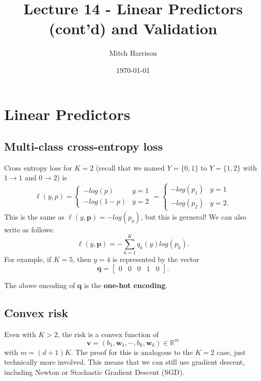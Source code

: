 \documentclass[titlepage, 12pt, leqno]{article}
\title{\Huge{Lecture 14 - Linear Predictors (cont'd) and Validation}}
\author{\large{Mitch Harrison}}
\date{\today}
\begin{document}
\setlength{\parskip}{1\baselineskip}
\setlength{\parindent}{15pt}
\maketitle
\tableofcontents
\newpage


\section{Linear Predictors}

\subsection{Multi-class cross-entropy loss}
Cross entropy loss for $K=2$ (recall that we named $Y=\{0,1\}$ to $Y=\{1,2\}$ with
$1 \rightarrow 1$ and $0 \rightarrow 2$) is 
\[
\ell(y,p) = 
\begin{cases}
    -log(p) & y = 1 \\
    -log(1-p) & y=2
\end{cases}
=
\begin{cases}
    -log(p_{1}) & y=1 \\
    -log(p_{2}) & y=2.
\end{cases}
\]
This is the same as $\ell(y,\textbf{p}) = -log(p_{y})$, but this is gerneral! We
can also write as follows:
\[
\ell(y,\textbf{p}) = -\sum_{k=1}^{K}q_{k}(y)log(p_{k}).
\]
For example, if $K=5$, then $y=4$ is represented by the vector
\[
\textbf{q} = 
\begin{bmatrix}
0 & 0 & 0 & 1 & 0
\end{bmatrix}.
\]
\begin{definition}
    The above encoding of $\textbf{q}$ is the \textbf{one-hot encoding}.
\end{definition}

\subsection{Convex risk}
Even with $K>2$, the risk is a convex function of
\[
    \textbf{v}  = (b_{1}, \textbf{w}_{1}, \cdots , b_{k}, \textbf{w}_{k}) \in 
    \mathbb{R}^{m}
\]
with $m = (d+1)K$. The proof for this is analogous to the $K=2$ case, just
technically more involved. This means that we can still use gradient descent,
including Newton or Stochastic Gradient Descent (SGD).
\end{document}
